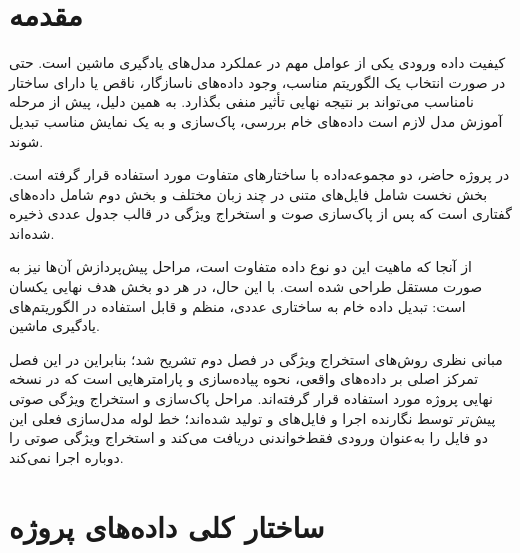 



\section{مقدمه}

کیفیت داده ورودی یکی از عوامل مهم در عملکرد مدل‌های یادگیری ماشین است. حتی در صورت انتخاب یک الگوریتم مناسب، وجود داده‌های ناسازگار، ناقص یا دارای ساختار نامناسب می‌تواند بر نتیجه نهایی تأثیر منفی بگذارد. به همین دلیل، پیش از مرحله آموزش مدل لازم است داده‌های خام بررسی، پاک‌سازی و به یک نمایش مناسب تبدیل شوند.

در پروژه حاضر، دو مجموعه‌داده با ساختارهای متفاوت مورد استفاده قرار گرفته است. بخش نخست شامل فایل‌های متنی در چند زبان مختلف و بخش دوم شامل داده‌های گفتاری است که پس از پاک‌سازی صوت و استخراج ویژگی در قالب جدول عددی ذخیره شده‌اند.

از آنجا که ماهیت این دو نوع داده متفاوت است، مراحل پیش‌پردازش آن‌ها نیز به صورت مستقل طراحی شده است. با این حال، در هر دو بخش هدف نهایی یکسان است: تبدیل داده خام به ساختاری عددی، منظم و قابل استفاده در الگوریتم‌های یادگیری ماشین.

مبانی نظری روش‌های استخراج ویژگی در فصل دوم تشریح شد؛ بنابراین در این فصل تمرکز اصلی بر داده‌های واقعی، نحوه پیاده‌سازی و پارامترهایی است که در نسخه نهایی پروژه مورد استفاده قرار گرفته‌اند. مراحل پاک‌سازی و استخراج ویژگی صوتی پیش‌تر توسط نگارنده اجرا و فایل‌های
و
تولید شده‌اند؛ خط لوله مدل‌سازی فعلی این دو فایل را به‌عنوان ورودی فقط‌خواندنی دریافت می‌کند و استخراج ویژگی صوتی را دوباره اجرا نمی‌کند.


\section{ساختار کلی داده‌های پروژه}

